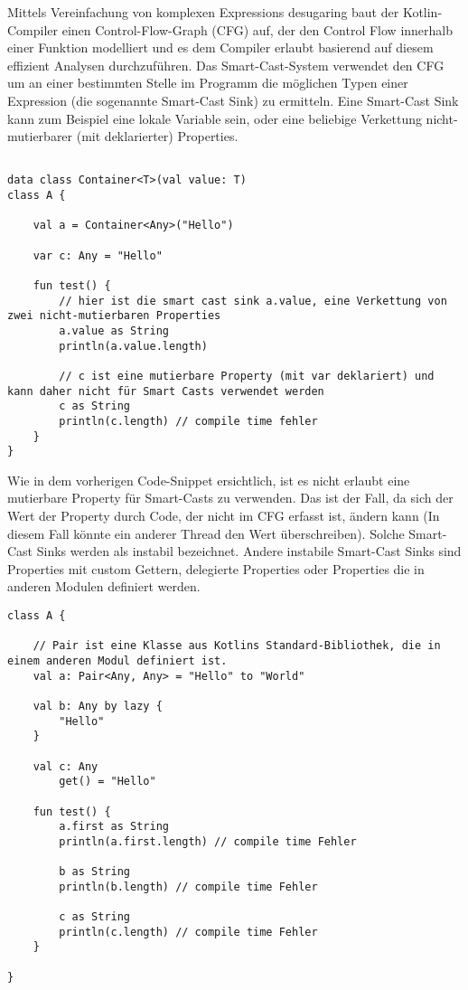 Mittels Vereinfachung von komplexen Expressions \bzw desugaring baut der Kotlin-Compiler einen Control-Flow-Graph (CFG)
auf, der den Control Flow innerhalb einer Funktion modelliert und es dem Compiler erlaubt basierend auf diesem effizient
Analysen durchzuführen.
Das Smart-Cast-System verwendet den CFG um an einer bestimmten Stelle im Programm die möglichen Typen einer Expression
(die sogenannte Smart-Cast Sink) zu ermitteln.
Eine Smart-Cast Sink kann zum Beispiel eine lokale Variable sein, oder eine beliebige Verkettung nicht-mutierbarer
(mit  deklarierter) Properties.

\begin{verbatim}

data class Container<T>(val value: T)
class A {

    val a = Container<Any>("Hello")

    var c: Any = "Hello"

    fun test() {
        // hier ist die smart cast sink a.value, eine Verkettung von zwei nicht-mutierbaren Properties
        a.value as String
        println(a.value.length)

        // c ist eine mutierbare Property (mit var deklariert) und kann daher nicht für Smart Casts verwendet werden
        c as String
        println(c.length) // compile time fehler
    }
}
\end{verbatim}

Wie in dem vorherigen Code-Snippet ersichtlich, ist es nicht erlaubt eine mutierbare Property für Smart-Casts zu
verwenden.
Das ist der Fall, da sich der Wert der Property durch Code, der nicht im CFG erfasst ist, ändern kann (In diesem Fall
könnte ein anderer Thread den Wert überschreiben).
Solche Smart-Cast Sinks werden als instabil bezeichnet.
Andere instabile Smart-Cast Sinks sind \zB Properties mit custom Gettern, delegierte Properties oder Properties die
in anderen Modulen definiert werden.

\begin{verbatim}
class A {

    // Pair ist eine Klasse aus Kotlins Standard-Bibliothek, die in einem anderen Modul definiert ist.
    val a: Pair<Any, Any> = "Hello" to "World"

    val b: Any by lazy {
        "Hello"
    }

    val c: Any
        get() = "Hello"

    fun test() {
        a.first as String
        println(a.first.length) // compile time Fehler

        b as String
        println(b.length) // compile time Fehler

        c as String
        println(c.length) // compile time Fehler
    }

}
\end{verbatim}

